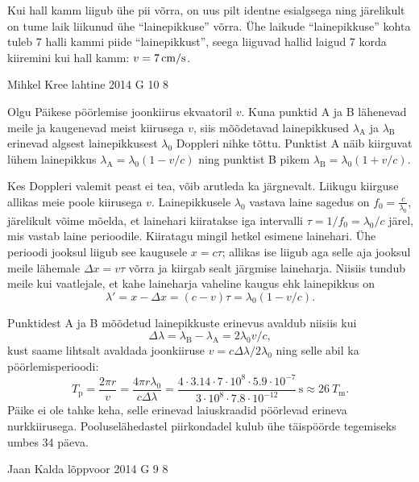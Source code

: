 \documentclass[11pt]{article}
\begin{document}
{{\ifSolution
Kui hall kamm liigub ühe pii võrra, on uus pilt identne esialgsega ning järelikult on tume laik liikunud ühe \enquote{lainepikkuse} võrra. 
Ühe laikude \enquote{lainepikkuse} kohta tuleb 7 halli kammi piide \enquote{lainepikkust}, seega liiguvad hallid laigud 7 korda kiiremini kui hall kamm: $v=\SI 7{cm/s}$.
\fi
}

{Mihkel Kree} %
{lahtine} %
{2014} %
{G 10} %
{8} %
{

\ifSolution
Olgu Päikese pöörlemise joonkiirus ekvaatoril $v$. Kuna punktid A ja B lähenevad meile ja kaugenevad meist kiirusega $v$, siis mõõdetavad lainepikkused $\lambda_\text{A}$ ja $\lambda_\text{B}$ erinevad algsest lainepikkusest $\lambda_0$ Doppleri nihke tõttu. Punktist A näib kiirguvat lühem lainepikkus $\lambda_\text{A}=\lambda_0(1-v/c)$ ning punktist B pikem $\lambda_\text{B}=\lambda_0(1+v/c)$.

Kes Doppleri valemit peast ei tea, võib arutleda ka järgnevalt. Liikugu kiirguse allikas meie poole kiirusega $v$. Lainepikkusele $\lambda_0$ vastava laine sagedus on $f_0=\frac{c}{\lambda_0}$, järelikult võime mõelda, et lainehari kiiratakse iga intervalli $\tau = 1/f_0 = \lambda_0/c$ järel, mis vastab laine perioodile. Kiiratagu mingil hetkel esimene lainehari. Ühe perioodi jooksul liigub see kaugusele $x=c\tau$; allikas ise liigub aga selle aja jooksul meile lähemale $\Delta x = v\tau$ võrra ja kiirgab sealt järgmise laineharja. Niisiis tundub meile kui vaatlejale, et kahe laineharja vaheline kaugus ehk lainepikkus on 
\[
\lambda'=x-\Delta x=(c-v)\tau = \lambda_0(1-v/c).
\]

Punktidest A ja B mõõdetud lainepikkuste erinevus avaldub niisiis kui 
\[
\Delta\lambda = \lambda_\text{B}-\lambda_\text{A} = 2\lambda_0 v/c,
\]
kust saame lihtsalt avaldada joonkiiruse $v=c\Delta\lambda/2\lambda_0$ ning selle abil ka pöörlemisperioodi:
\[
T_\text{p}=\frac{2\pi r}{v}=\frac{4 \pi r \lambda_0}{c\Delta \lambda}=
\frac{4 \cdot 3.14 \cdot 7\cdot 10^8 \cdot 5.9 \cdot 10^{-7}}{3\cdot 10^8\cdot 7.8\cdot 10^{-12}}\,\text{s}\approx \SI{26}{\textit{T}_\text{m}}.
\]
Päike ei ole tahke keha, selle erinevad laiuskraadid pöörlevad erineva nurkkiirusega. Pooluselähedastel piirkondadel kulub ühe täispöörde tegemiseks umbes 34 päeva.
\fi
}

{Jaan Kalda} %
{lõppvoor} %
{2014} %
{G 9} %
{8} %
{

}}
\end{document}
